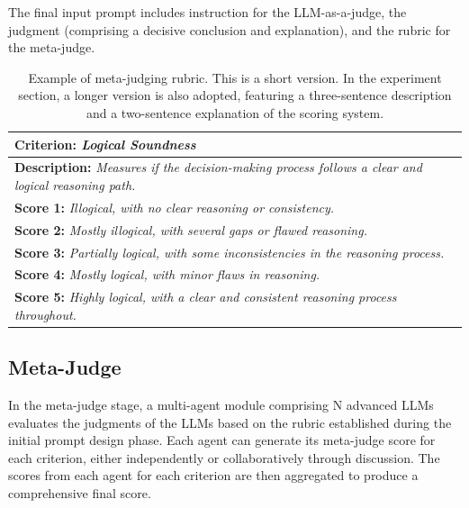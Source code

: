 \documentclass{article}
\theoremstyle{plain}
\theoremstyle{definition}
\theoremstyle{remark}
\begin{document}
The final input prompt includes instruction for the LLM-as-a-judge, the judgment (comprising a decisive conclusion and explanation), and the rubric for the meta-judge. 

\begin{table}[h!]
    \centering
    \setlength{\tabcolsep}{8pt} %
    \renewcommand{\arraystretch}{1.5} %
    \begin{tabular}{p{}}
        \toprule
       \rowcolor{gray!20} \textbf{Criterion:} \textit{Logical Soundness} \\
        \midrule 
         \textbf{Description:} \textit{Measures if the decision-making process follows a clear and logical reasoning path.} \\
        \midrule
        \rowcolor{customgreen!10} \textbf{Score 1:} \textit{Illogical, with no clear reasoning or consistency.}\\ 
        \rowcolor{customgreen!20} \textbf{Score 2:} \textit{Mostly illogical, with several gaps or flawed reasoning.}\\ 
        \rowcolor{customgreen!30} \textbf{Score 3:} \textit{Partially logical, with some inconsistencies in the reasoning process.}\\ 
        \rowcolor{customgreen!50} \textbf{Score 4:} \textit{Mostly logical, with minor flaws in reasoning.}\\ 
        \rowcolor{customgreen!70} \textbf{Score 5:} \textit{Highly logical, with a clear and consistent reasoning process throughout.}\\ 
        \bottomrule
    \end{tabular}
    \caption{Example of meta-judging rubric. This is a short version. In the experiment section, a longer version is also adopted, featuring a three-sentence description and a two-sentence explanation of the scoring system.}
    \label{tab:rubric-describe0}
\end{table}


\subsection{Meta-Judge}
In the meta-judge stage, a multi-agent module comprising N advanced LLMs evaluates the judgments of the LLMs based on the rubric established during the initial prompt design phase. 
Each agent can generate its meta-judge score for each criterion, either independently or collaboratively through discussion. The scores from each agent for each criterion are then aggregated to produce a comprehensive final score.
\end{document}
